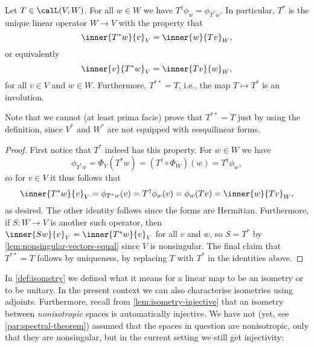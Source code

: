\begin{proposition}
    \label{prop:adjoint-inner-product}
    Let $T \in \lin(V,W)$. For all $w \in W$ we have $T^\dagger \phi_w = \phi_{T^* w}$. In particular, $T^*$ is the unique linear operator $W \to V$ with the property that
    \begin{equation*}
        \inner{T^*w}{v}_V = \inner{w}{Tv}_W,
    \end{equation*}
    or equivalently
    \begin{equation*}
        \inner{v}{T^*w}_V = \inner{Tv}{w}_W,
    \end{equation*}
    for all $v \in V$ and $w \in W$. Furthermore, $T^{**} = T$, i.e., the map $T \mapsto T^*$ is an involution.
\end{proposition}
%
Note that we cannot (at least prima facie) prove that $T^{**} = T$ just by using the definition, since $V^*$ and $W^*$ are not equipped with sesquilinear forms.

\begin{proof}
    First notice that $T^*$ indeed has this property. For $w \in W$ we have
    \begin{equation*}
        \phi_{T^* w}
            = \Phi_V (T^* w)
            = (T^\dagger \circ \Phi_W)(w)
            = T^\dagger \phi_w,
    \end{equation*}
    so for $v \in V$ it thus follows that
    \begin{equation*}
        \inner{T^* w}{v}_V
            = \phi_{T^* w}(v)
            = T^\dagger \phi_w (v)
            = \phi_w(Tv)
            = \inner{w}{Tv}_W,
    \end{equation*}
    as desired. The other identity follows since the forms are Hermitian. Furthermore, if $S \colon W \to V$ is another such operator, then $\inner{Sw}{v}_V = \inner{T^*w}{v}_V$ for all $v$ and $w$, so $S = T^*$ by \cref{lem:nonsingular-vectors-equal} since $V$ is nonsingular. The final claim that $T^{**} = T$ follows by uniqueness, by replacing $T$ with $T^*$ in the identities above.
\end{proof}


In \cref{def:isometry} we defined what it means for a linear map to be an isometry or to be unitary. In the present context we can also characterise isometries using adjoints. Furthermore, recall from \cref{lem:isometry-injective} that an isometry between \emph{nonisotropic} spaces is automatically injective. We have not (yet, see \cref{par:spectral-theorem}) assumed that the spaces in question are nonisotropic, only that they are nonsingular, but in the current setting we still get injectivity:

